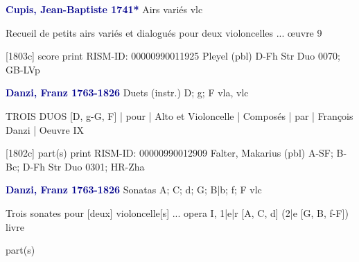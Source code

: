 \documentclass[twocolumn]{book}
\begin{document}
\newline \par \vspace{7pt} \textcolor{darkblue}{\textbf{Cupis, Jean-Baptiste  1741*}}
\newline Airs variés    
 vlc
\newline \begin{itshape}Recueil de petits airs variés et dialogués pour deux violoncelles ... œuvre 9\end{itshape} 
\newline \textcolor{darkblue}{}  [1803c]  score  
\newline print
\newline RISM-ID: 00000990011925
\newline Pleyel  (pbl)
\newline D-Fh  Str Duo 0070; GB-LVp
\newline \par \vspace{7pt} \textcolor{darkblue}{\textbf{Danzi, Franz  1763-1826}}
\newline Duets (instr.)  D; g; F  
\newline vla, vlc
\newline \begin{itshape}TROIS DUOS [D, g-G, F] | pour | Alto et Violoncelle | Composés | par | François Danzi |  Oeuvre IX\end{itshape} 
\newline \textcolor{darkblue}{}  [1802c]  part(s)  
\newline print
\newline RISM-ID: 00000990012909
\newline Falter, Makarius  (pbl)
\newline A-SF; B-Bc; D-Fh  Str Duo 0301; HR-Zha
\newline \par \vspace{7pt} \textcolor{darkblue}{\textbf{Danzi, Franz  1763-1826}}
\newline Sonatas  A; C; d; G; B|b; f; F  
 vlc
\newline \begin{itshape}Trois sonates pour [deux] violoncelle[s] ... opera I, 1|e|r [A, C, d] (2|e [G, B, f-F]) livre\end{itshape} 
\newline \textcolor{darkblue}{}  part(s)  
\end{document}
